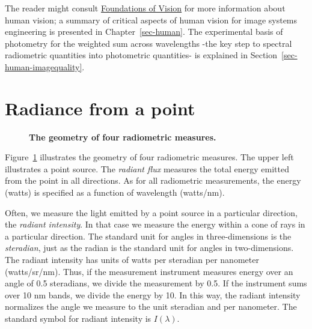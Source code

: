 \documentclass[
  letterpaper,
]{book}
\begin{document}
The reader might consult
\href{https://wandell.github.io/FOV-1995}{Foundations of Vision} for
more information about human vision; a summary of critical aspects of
human vision for image systems engineering is presented in
Chapter~\ref{sec-human}. The experimental basis of photometry for the
weighted sum across wavelengths -the key step to spectral radiometric
quantities into photometric quantities- is explained in
Section~\ref{sec-human-imagequality}.

\section{Radiance from a point}\label{radiance-from-a-point}

\begin{figure}


\caption{\label{fig-radiometry}\textbf{The geometry of four radiometric
measures.}}

\end{figure}%

Figure~\ref{fig-radiometry} illustrates the geometry of four radiometric
measures. The upper left illustrates a point source. The \emph{radiant
flux} measures the total energy emitted from the point in all
directions. As for all radiometric measurements, the energy (watts) is
specified as a function of wavelength (watts/nm).

Often, we measure the light emitted by a point source in a particular
direction, the \emph{radiant intensity}. In that case we measure the
energy within a cone of rays in a particular direction. The standard
unit for angles in three-dimensions is the \emph{steradian}, just as the
radian is the standard unit for angles in two-dimensions. The radiant
intensity has units of watts per steradian per nanometer (watts/sr/nm).
Thus, if the measurement instrument measures energy over an angle of 0.5
steradians, we divide the measurement by 0.5. If the instrument sums
over 10 nm bands, we divide the energy by 10. In this way, the radiant
intensity normalizes the angle we measure to the unit steradian and per
nanometer. The standard symbol for radiant intensity is \(I(\lambda)\).
\end{document}
